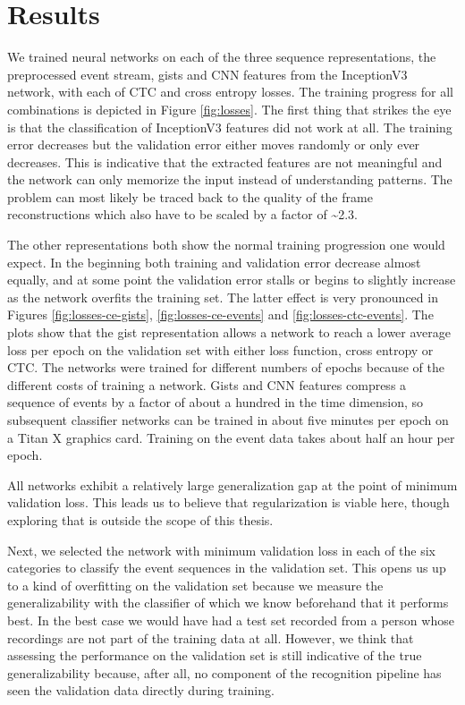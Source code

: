 \chapter{Results}
\label{cha:results}

We trained neural networks on each of the three sequence representations, the
preprocessed event stream, gists and CNN features from the InceptionV3 network,
with each of CTC and cross entropy losses. The training progress for all
combinations is depicted in Figure \ref{fig:losses}. The first thing that
strikes the eye is that the classification of InceptionV3 features did not work
at all. The training error decreases but the validation error either moves
randomly or only ever decreases. This is indicative that the extracted features
are not meaningful and the network can only memorize the input instead of
understanding patterns. The problem can most likely be traced back to the
quality of the frame reconstructions which also have to be scaled by a factor of
\textasciitilde 2.3.

The other representations both show the normal training progression one would
expect. In the beginning both training and validation error decrease almost
equally, and at some point the validation error stalls or begins to slightly
increase as the network overfits the training set. The latter effect is very
pronounced in Figures \ref{fig:losses-ce-gists}, \ref{fig:losses-ce-events} and
\ref{fig:losses-ctc-events}. The plots show that the gist representation allows
a network to reach a lower average loss per epoch on the validation set with
either loss function, cross entropy or CTC. The networks were trained for
different numbers of epochs because of the different costs of training a
network. Gists and CNN features compress a sequence of events by a factor of
about a hundred in the time dimension, so subsequent classifier networks can be
trained in about five minutes per epoch on a Titan X graphics card. Training on
the event data takes about half an hour per epoch.

All networks exhibit a relatively large generalization gap at the point of
minimum validation loss. This leads us to believe that regularization is viable
here, though exploring that is outside the scope of this thesis.

Next, we selected the network with minimum validation loss in each of the six
categories to classify the event sequences in the validation set. This opens us
up to a kind of overfitting on the validation set because we measure the
generalizability with the classifier of which we know beforehand that it
performs best. In the best case we would have had a test set recorded from a
person whose recordings are not part of the training data at all. However, we
think that assessing the performance on the validation set is still indicative
of the true generalizability because, after all, no component of the recognition
pipeline has seen the validation data directly during training.

